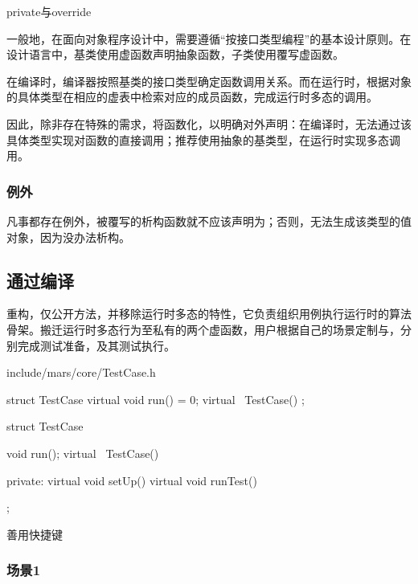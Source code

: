 \begin{content}
\begin{episode}{private与override}
\begin{content}
一般地，在面向对象程序设计中，需要遵循“按接口类型编程”的基本设计原则。在设计语言中，基类使用虚函数声明抽象函数，子类使用覆写虚函数。

在编译时，编译器按照基类的接口类型确定函数调用关系。而在运行时，根据对象的具体类型在相应的虚表中检索对应的成员函数，完成运行时多态的调用。

因此，除非存在特殊的需求，将函数化，以明确对外声明：在编译时，无法通过该具体类型实现对函数的直接调用；推荐使用抽象的基类型，在运行时实现多态调用。

\subsubsection{例外}

凡事都存在例外，被覆写的析构函数就不应该声明为；否则，无法生成该类型的值对象，因为没办法析构。

\end{content}
\end{episode}

\subsection{通过编译}

重构，仅公开方法，并移除运行时多态的特性，它负责组织用例执行运行时的算法骨架。搬迁运行时多态行为至私有的两个虚函数，用户根据自己的场景定制与，分别完成测试准备，及其测试执行。

\begin{diff}{include/mars/core/TestCase.h}
 \begin{minicpp}
struct TestCase {
  virtual void run() = 0;
  virtual ~TestCase() {}
}; 
 \end{minicpp}
\tcblower
 \begin{minicpp}
struct TestCase {
  void run();
  virtual ~TestCase() {}

private:
  virtual void setUp() {}
  virtual void runTest() {}
};
 \end{minicpp} 
\end{diff}


\begin{episode}{善用快捷键}
\begin{content}

\subsubsection{场景1}


\end{content}
\end{episode}
\end{content}
